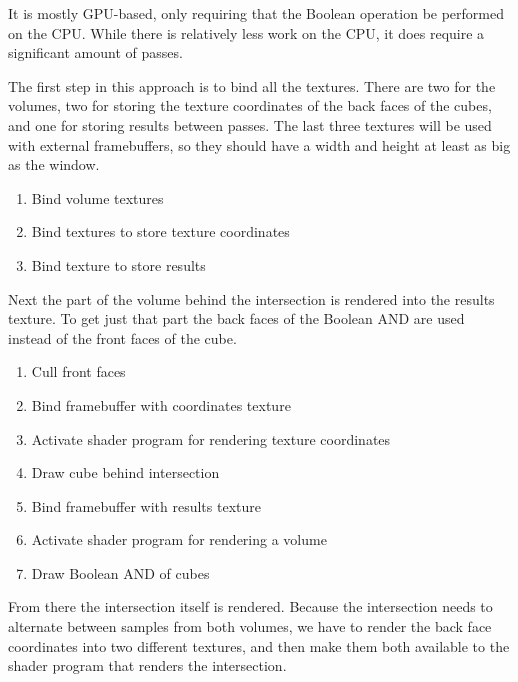 \documentclass{report}
\begin{document}
It is mostly GPU-based, only requiring that the Boolean operation be performed
on the CPU.  While there is relatively less work on the CPU, it does require a
significant amount of passes.

The first step in this approach is to bind all the textures.  There are two for
the volumes, two for storing the texture coordinates of the back faces of the
cubes, and one for storing results between passes.  The last three textures will
be used with external framebuffers, so they should have a width and height at
least as big as the window.

\begin{enumerate}
  \item Bind volume textures
  \item Bind textures to store texture coordinates
  \item Bind texture to store results
\end{enumerate}

Next the part of the volume behind the intersection is rendered into the results
texture.  To get just that part the back faces of the Boolean AND are used
instead of the front faces of the cube.

\begin{enumerate}
  \item Cull front faces
  \item Bind framebuffer with coordinates texture
  \item Activate shader program for rendering texture coordinates
  \item Draw cube behind intersection
  \item Bind framebuffer with results texture
  \item Activate shader program for rendering a volume
  \item Draw Boolean AND of cubes
\end{enumerate}

From there the intersection itself is rendered.  Because the intersection needs
to alternate between samples from both volumes, we have to render the back face
coordinates into two different textures, and then make them both available to
the shader program that renders the intersection.
\end{document}
